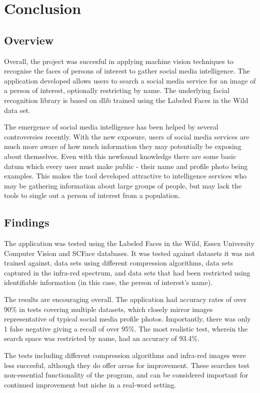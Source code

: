 \documentclass[12pt]{article}
\begin{document}
\newpage
\section{Conclusion}
\subsection{Overview}
Overall, the project was succesful in applying machine vision techniques to recognise the faces of persons of interest to gather social media intelligence. The application developed allows users to search a social media service for an image of a person of interest, optionally restricting by name. The underlying facial recognition library is based on dlib trained using the Labeled Faces in the Wild data set.

The emergence of social media intelligence has been helped by several controversies recently. With the new exposure, users of social media services are much more aware of how much information they may potentially be exposing about themselves. Even with this newfound knowledge there are some basic datum which every user must make public - their name and profile photo being examples. This makes the tool developed attractive to intelligence services who may be gathering information about large groups of people, but may lack the tools to single out a person of interest from a population.

\subsection{Findings}
The application was tested using the Labeled Faces in the Wild, Essex University Computer Vision and SCFace databases. It was tested against datasets it was not trained against, data sets using different compression algorithms, data sets captured in the infra-red spectrum, and data sets that had been restricted using identifiable information (in this case, the person of interest's name). 

The results are encouraging overall. The application had accuracy rates of over 90\% in tests covering multiple datasets, which closely mirror images representative of typical social media profile photos. Importantly, there was only 1 false negative giving a recall of over 95\%. The most realistic test, wherein the search space was restricted by name, had an accuracy of 93.4\%.

The tests including different compression algorithms and infra-red images were less succesful, although they do offer areas for improvement. These searches test non-essential functionality of the program, and can be considered important for continued improvement but niche in a real-word setting.
\end{document}
